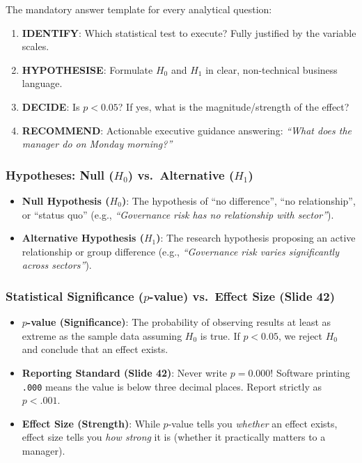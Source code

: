 \documentclass[
]{article}
\providecommand{\tightlist}{%
  \setlength{\itemsep}{0pt}\setlength{\parskip}{0pt}}
\begin{document}
The mandatory answer template for every analytical question:

\begin{enumerate}
\def\labelenumi{\arabic{enumi}.}
\tightlist
\item
  \textbf{IDENTIFY}: Which statistical test to execute? Fully justified
  by the variable scales.
\item
  \textbf{HYPOTHESISE}: Formulate \(H_0\) and \(H_1\) in clear,
  non-technical business language.
\item
  \textbf{DECIDE}: Is \(p < 0.05\)? If yes, what is the
  magnitude/strength of the effect?
\item
  \textbf{RECOMMEND}: Actionable executive guidance answering:
  \emph{``What does the manager do on Monday morning?''}
\end{enumerate}

\subsubsection{\texorpdfstring{Hypotheses: Null (\(H_0\))
vs.~Alternative
(\(H_1\))}{Hypotheses: Null (H\_0) vs.~Alternative (H\_1)}}\label{hypotheses-null-h_0-vs.-alternative-h_1}

\begin{itemize}
\tightlist
\item
  \textbf{Null Hypothesis (\(H_0\))}: The hypothesis of ``no
  difference'', ``no relationship'', or ``status quo'' (e.g.,
  \emph{``Governance risk has no relationship with sector''}).
\item
  \textbf{Alternative Hypothesis (\(H_1\))}: The research hypothesis
  proposing an active relationship or group difference (e.g.,
  \emph{``Governance risk varies significantly across sectors''}).
\end{itemize}

\subsubsection{\texorpdfstring{Statistical Significance (\(p\)-value)
vs.~Effect Size (Slide
42)}{Statistical Significance (p-value) vs.~Effect Size (Slide 42)}}\label{statistical-significance-p-value-vs.-effect-size-slide-42}

\begin{itemize}
\tightlist
\item
  \textbf{\(p\)-value (Significance)}: The probability of observing
  results at least as extreme as the sample data assuming \(H_0\) is
  true. If \(p < 0.05\), we reject \(H_0\) and conclude that an effect
  exists.
\item
  \textbf{Reporting Standard (Slide 42)}: Never write \(p = 0.000\)!
  Software printing \texttt{.000} means the value is below three decimal
  places. Report strictly as \textbf{\(p < .001\)}.
\item
  \textbf{Effect Size (Strength)}: While \(p\)-value tells you
  \emph{whether} an effect exists, effect size tells you \emph{how
  strong} it is (whether it practically matters to a manager).
\end{itemize}
\end{document}
